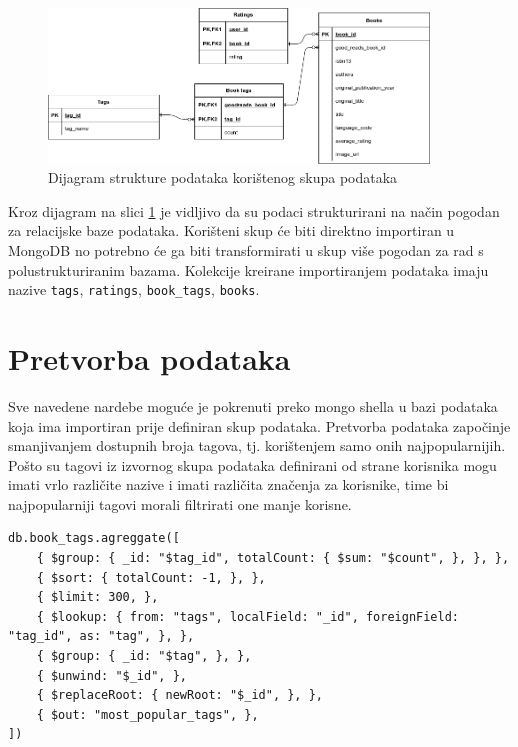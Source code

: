 \documentclass[]{foi}
\begin{document}
\begin{figure}[h!]
	\centering
	\includegraphics[width=0.9\textwidth]{slike/goodbooks-10k_dijagram.png}
	\caption{Dijagram strukture podataka korištenog skupa podataka}
	\label{fig:struktura_podataka}
\end{figure}

Kroz dijagram na slici \ref{fig:struktura_podataka} je vidljivo da su podaci strukturirani na način pogodan za relacijske baze podataka.
Korišteni skup će biti direktno importiran u MongoDB no potrebno će ga biti transformirati u skup više pogodan za rad s polustrukturiranim bazama.
Kolekcije kreirane importiranjem podataka imaju nazive \texttt{tags}, \texttt{ratings}, \texttt{book\_tags}, \texttt{books}.

\section{Pretvorba podataka}

Sve navedene nardebe moguće je pokrenuti preko mongo shella u bazi podataka koja ima importiran prije definiran skup podataka.
Pretvorba podataka započinje smanjivanjem dostupnih broja tagova, tj. korištenjem samo onih najpopularnijih. Pošto su tagovi iz izvornog
skupa podataka definirani od strane korisnika mogu imati vrlo različite nazive i imati različita značenja za korisnike, time bi
najpopularniji tagovi morali filtrirati one manje korisne.

\begin{verbatim}
db.book_tags.agreggate([
    { $group: { _id: "$tag_id", totalCount: { $sum: "$count", }, }, },
    { $sort: { totalCount: -1, }, },
    { $limit: 300, },
    { $lookup: { from: "tags", localField: "_id", foreignField: "tag_id", as: "tag", }, },
    { $group: { _id: "$tag", }, },
    { $unwind: "$_id", },
    { $replaceRoot: { newRoot: "$_id", }, },
    { $out: "most_popular_tags", },
])
\end{verbatim}
\label{lst:tagovi}
\end{document}
